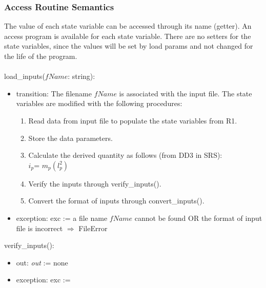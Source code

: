 \documentclass[12pt, titlepage]{article}
\begin{document}
\subsubsection{Access Routine Semantics}
The value of each state variable can be accessed through its name (getter). An access program is available for each state variable. There are no setters for the state variables, since the values will be set by load params and not changed for the life of the program.\\
\\
\noindent load\_inputs($fName$: string):
\begin{itemize}
\item transition: The filename $fName$ is associated with the input file. The state variables are modified with the following procedures:
\begin{enumerate}
\item Read data  from input file to populate the state variables from R1.
\item Store the data parameters.
\item Calculate the derived quantity as follows (from DD3 in SRS):\\
        $i_p$= $m_p(l_p^2)$ 
\item Verify the inputs through verify\_inputs().
\item Convert the format of inputs through convert\_inputs().
\end{enumerate}

\item exception: exc := a file name $fName$ cannot be found OR the format of input file is incorrect $\Rightarrow$  FileError
\end{itemize}

\noindent verify\_inputs():
\begin{itemize}
\item out: \textit{out} := none
\item exception: exc := 
\end{itemize}
\end{document}
